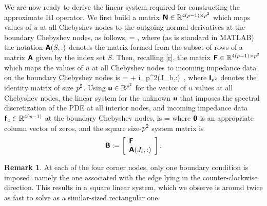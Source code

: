 \documentclass[11pt,final]{amsart}
\theoremstyle{definition}
\newtheorem{remark}{Remark}
\numberwithin{remark}{section}
\numberwithin{definition}{section}
\numberwithin{pro}{section}
\begin{document}
We are now ready to derive the linear system required for constructing
the approximate ItI operator. %
We first build a matrix ${\bm{\mathsf{N}}}\in\mathbb{R}^{4(p-1)\times p^2}$ which maps values of
$u$ at all Chebyshev nodes to the outgoing normal derivatives at the boundary
Chebyshev nodes, as follows,
\be
\NN = \left[\begin{array}{r}-\Dy(J_s,:)\\\Dx(J_e,:)\\\Dy(J_n,:)\\-\Dx(J_w,:)\end{array}\right],
\label{N}
\ee
where (as is standard in MATLAB) the notation $\bm{\mathsf{A}}(S,:)$
denotes the matrix formed from the subset of rows of a matrix $\bm{\mathsf{A}}$
given by the index set $S$.
Then, recalling \eqref{r},
the matrix $\bm{\mathsf{F}}\in\mathbb{R}^{4(p-1)\times p^2}$ which maps
the values of
$u$ at all Chebyshev nodes to incoming impedance data
on the boundary Chebyshev nodes is
\be
{} \;=\; \NN \;+\; i\eta {}_{p^2}(J_b,:)~,
\ee
where $\bm{\mathsf{I}}_{p^2}$ denotes the identity matrix of size $p^2$.
Using $\bm{\mathsf{u}}\in\mathbb{R}^{p^2}$ for the vector of $u$ values at all Chebyshev nodes,
the linear system for the unknown $\bm{\mathsf{u}}$ that imposes the spectral discretization of the PDE at all interior nodes,
and incoming impedance data $\bm{\mathsf{f}}_c\in\mathbb{R}^{4(p-1)}$
at the boundary Chebyshev nodes,
is
\be
{} \uu = 
\label{eq:localsolve}
\ee
where $\bm{\mathsf{0}}$ is an appropriate column vector of zeros, and
the square size-$p^2$ system matrix is
$$
\mtx{B} := \left[\begin{array}{l}
\mtx{F} \\ %
\mtx{A}(J_i,:)
\end{array}\right].
$$
\begin{remark}
At each of the four corner nodes, only one boundary condition is imposed,
namely the one associated with the edge lying in the counter-clockwise
direction. This results in a square linear system, which we observe
is around twice
as fast to solve as a similar-sized rectangular one.
\end{remark}
\end{document}
